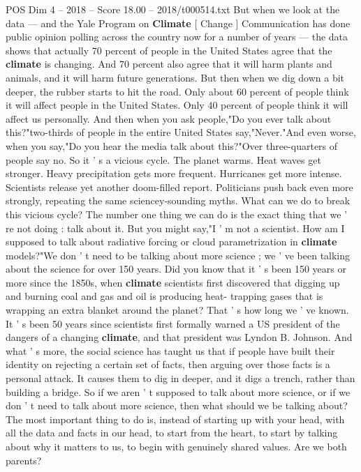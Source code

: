 \begin{textsample}{POS Dim 4 – 2018 – Score 18.00 – 2018/t000514.txt}
But when we look at the data — and the Yale Program on \textbf{Climate} [ Change ] Communication has done public opinion polling across the country now for a number of years — the data shows that actually 70 percent of people in the United States agree that the \textbf{climate} is changing.
And 70 percent also agree that it will harm plants and animals, and it will harm future generations.
But then when we dig down a bit deeper, the rubber starts to hit the road.
Only about 60 percent of people think it will affect people in the United States.
Only 40 percent of people think it will affect us personally.
And then when you ask people,"Do you ever talk about this?"two-thirds of people in the entire United States say,"Never."And even worse, when you say,"Do you hear the media talk about this?"Over three-quarters of people say no.
So it ' s a vicious cycle.
The planet warms.
Heat waves get stronger.
Heavy precipitation gets more frequent.
Hurricanes get more intense.
Scientists release yet another doom-filled report.
Politicians push back even more strongly, repeating the same sciencey-sounding myths.
What can we do to break this vicious cycle?
The number one thing we can do is the exact thing that we ' re not doing : talk about it.
But you might say,"I ' m not a scientist.
How am I supposed to talk about radiative forcing or cloud parametrization in \textbf{climate} models?"We don ' t need to be talking about more science ; we ' ve been talking about the science for over 150 years.
Did you know that it ' s been 150 years or more since the 1850s, when \textbf{climate} scientists first discovered that digging up and burning coal and gas and oil is producing heat- trapping gases that is wrapping an extra blanket around the planet?
That ' s how long we ' ve known.
It ' s been 50 years since scientists first formally warned a US president of the dangers of a changing \textbf{climate}, and that president was Lyndon B.
Johnson.
And what ' s more, the social science has taught us that if people have built their identity on rejecting a certain set of facts, then arguing over those facts is a personal attack.
It causes them to dig in deeper, and it digs a trench, rather than building a bridge.
So if we aren ' t supposed to talk about more science, or if we don ' t need to talk about more science, then what should we be talking about?
The most important thing to do is, instead of starting up with your head, with all the data and facts in our head, to start from the heart, to start by talking about why it matters to us, to begin with genuinely shared values.
Are we both parents?

\end{textsample}
